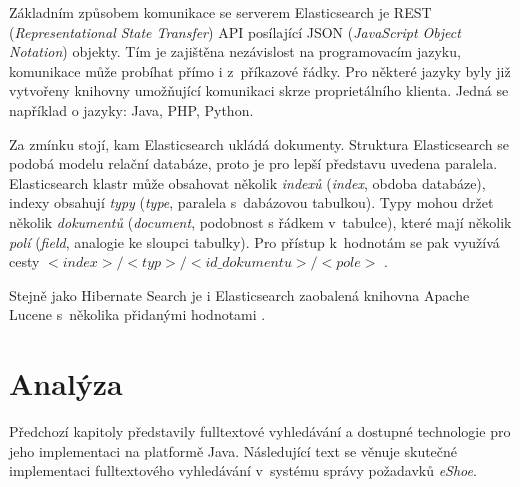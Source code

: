 \documentclass[11pt,oneside]{fithesis2}
\begin{document}
Základním způsobem komunikace se serverem Elasticsearch je REST (\emph{Representational State Transfer}) API posílající JSON (\emph{JavaScript Object Notation}) objekty. Tím je zajištěna nezávislost na programovacím jazyku, komunikace může probíhat přímo i z~příkazové řádky. Pro některé jazyky byly již vytvořeny knihovny umožňující komunikaci skrze proprietálního klienta. Jedná se například o jazyky: Java, PHP, Python. 

Za zmínku stojí, kam Elasticsearch ukládá dokumenty. Struktura Elasticsearch se podobá modelu relační databáze, proto je pro lepší představu uvedena paralela. Elasticsearch klastr může obsahovat několik \emph{indexů} (\emph{index}, obdoba databáze), indexy obsahují \emph{typy} (\emph{type}, paralela s~dabázovou tabulkou). Typy mohou držet několik \emph{dokumentů} (\emph{document}, podobnost s řádkem v~tabulce), které mají několik \emph{polí} (\emph{field}, analogie ke sloupci tabulky). Pro přístup k~hodnotám se pak využívá cesty $<index>/<typ>/<id\_dokumentu>/<pole>$ \cite{ElasticsearchDefinitiveGuide}.

Stejně jako Hibernate Search je i Elasticsearch zaobalená knihovna Apache Lucene s~několika přidanými hodnotami \cite{ElasticsearchDefinitiveGuide}. 

\chapter{Analýza}
\label{Analyza}
Předchozí kapitoly představily fulltextové vyhledávání a dostupné technologie pro jeho implementaci na platformě Java. Následující text se věnuje skutečné implementaci fulltextového vyhledávání v~systému správy požadavků \emph{eShoe}. 

\end{document}
